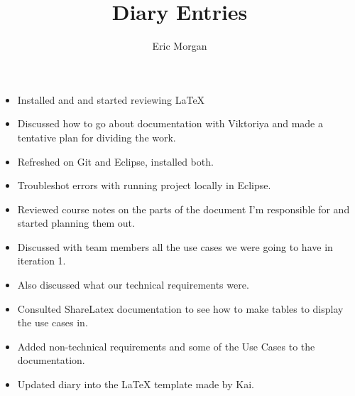 \documentclass{article}
\title{Diary Entries}
\author{Eric Morgan}
\begin{document}
	\maketitle
	
	\begin{itemize}
		\item Installed and and started reviewing LaTeX
	\end{itemize}
	
	\begin{itemize}
		\item Discussed how to go about documentation with Viktoriya and made a 			tentative plan for dividing the work.
	\end{itemize}
	
	\begin{itemize}
		\item Refreshed on Git and Eclipse, installed both.
		\item Troubleshot errors with running project locally in Eclipse.
		\item Reviewed course notes on the parts of the document I'm responsible for and started planning them out.
	\end{itemize}
	
	\begin{itemize}
		\item Discussed with team members all the use cases we were going to have in iteration 1.
		\item Also discussed what our technical requirements were.
	\end{itemize}
	
	\begin{itemize}
		\item Consulted ShareLatex documentation to see how to make tables to display 		the use cases in.
		\item Added non-technical requirements and some of the Use Cases to the documentation.
	\end{itemize}
	
	\begin{itemize}
		\item Updated diary into the LaTeX template made by Kai.
	\end{itemize}
\end{document}
